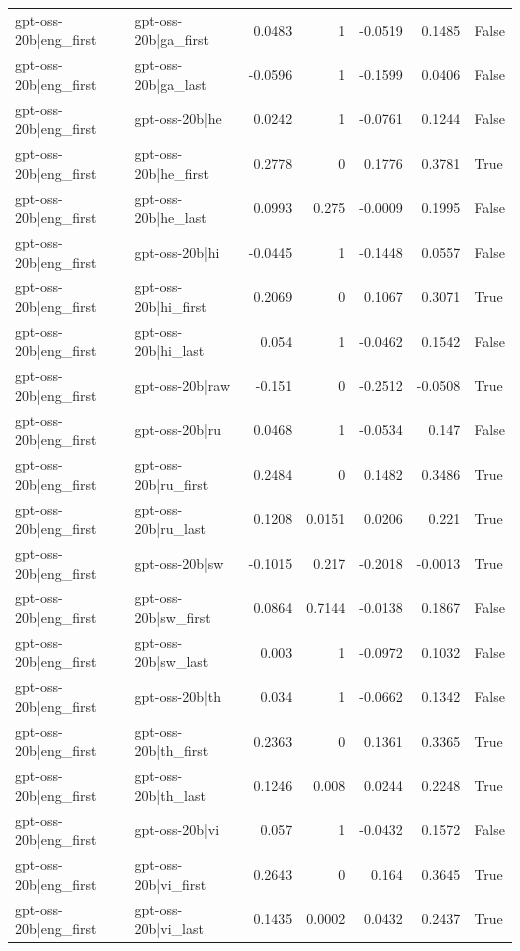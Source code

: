 \begin{table}
\begin{tabular}{l l r r r r l}
gpt-oss-20b|eng_first & gpt-oss-20b|ga_first & 0.0483 & 1 & -0.0519 & 0.1485 & False \\
gpt-oss-20b|eng_first & gpt-oss-20b|ga_last & -0.0596 & 1 & -0.1599 & 0.0406 & False \\
gpt-oss-20b|eng_first & gpt-oss-20b|he & 0.0242 & 1 & -0.0761 & 0.1244 & False \\
gpt-oss-20b|eng_first & gpt-oss-20b|he_first & 0.2778 & 0 & 0.1776 & 0.3781 & True \\
gpt-oss-20b|eng_first & gpt-oss-20b|he_last & 0.0993 & 0.275 & -0.0009 & 0.1995 & False \\
gpt-oss-20b|eng_first & gpt-oss-20b|hi & -0.0445 & 1 & -0.1448 & 0.0557 & False \\
gpt-oss-20b|eng_first & gpt-oss-20b|hi_first & 0.2069 & 0 & 0.1067 & 0.3071 & True \\
gpt-oss-20b|eng_first & gpt-oss-20b|hi_last & 0.054 & 1 & -0.0462 & 0.1542 & False \\
gpt-oss-20b|eng_first & gpt-oss-20b|raw & -0.151 & 0 & -0.2512 & -0.0508 & True \\
gpt-oss-20b|eng_first & gpt-oss-20b|ru & 0.0468 & 1 & -0.0534 & 0.147 & False \\
gpt-oss-20b|eng_first & gpt-oss-20b|ru_first & 0.2484 & 0 & 0.1482 & 0.3486 & True \\
gpt-oss-20b|eng_first & gpt-oss-20b|ru_last & 0.1208 & 0.0151 & 0.0206 & 0.221 & True \\
gpt-oss-20b|eng_first & gpt-oss-20b|sw & -0.1015 & 0.217 & -0.2018 & -0.0013 & True \\
gpt-oss-20b|eng_first & gpt-oss-20b|sw_first & 0.0864 & 0.7144 & -0.0138 & 0.1867 & False \\
gpt-oss-20b|eng_first & gpt-oss-20b|sw_last & 0.003 & 1 & -0.0972 & 0.1032 & False \\
gpt-oss-20b|eng_first & gpt-oss-20b|th & 0.034 & 1 & -0.0662 & 0.1342 & False \\
gpt-oss-20b|eng_first & gpt-oss-20b|th_first & 0.2363 & 0 & 0.1361 & 0.3365 & True \\
gpt-oss-20b|eng_first & gpt-oss-20b|th_last & 0.1246 & 0.008 & 0.0244 & 0.2248 & True \\
gpt-oss-20b|eng_first & gpt-oss-20b|vi & 0.057 & 1 & -0.0432 & 0.1572 & False \\
gpt-oss-20b|eng_first & gpt-oss-20b|vi_first & 0.2643 & 0 & 0.164 & 0.3645 & True \\
gpt-oss-20b|eng_first & gpt-oss-20b|vi_last & 0.1435 & 0.0002 & 0.0432 & 0.2437 & True \\

\end{tabular}
\end{table}
